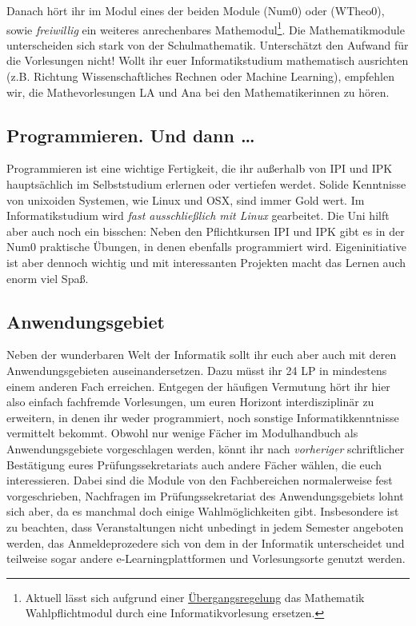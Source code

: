 Danach hört ihr im Modul  eines der beiden Module  (\gls{Num0}) oder  (\gls{WTheo0}), sowie \emph{freiwillig} ein weiteres anrechenbares Mathemodul\footnote{Aktuell lässt sich aufgrund einer \href{https://www.informatik.uni-heidelberg.de/?id=400}{Übergangsregelung} das Mathematik Wahlpflichtmodul durch eine Informatikvorlesung ersetzen.}. Die Mathematikmodule unterscheiden sich stark von der Schulmathematik. Unterschätzt den Aufwand für die Vorlesungen nicht! Wollt ihr euer Informatikstudium mathematisch ausrichten (z.B. Richtung Wissenschaftliches Rechnen oder Machine Learning), empfehlen wir, die Mathevorlesungen \gls{LA} und \gls{Ana} bei den Mathematikerinnen zu hören.

\subsection{Programmieren. Und dann \dots}

Programmieren ist eine wichtige Fertigkeit, die ihr außerhalb von \gls{IPI} und \gls{IPK} hauptsächlich im Selbststudium erlernen oder vertiefen werdet. Solide Kenntnisse von unixoiden Systemen, wie Linux und OSX, sind immer Gold wert. Im Informatikstudium wird \emph{fast ausschließlich mit Linux} gearbeitet. Die Uni hilft aber auch noch ein bisschen: Neben den Pflichtkursen \gls{IPI} und \gls{IPK} gibt es in der \gls{Num0} praktische Übungen, in denen ebenfalls programmiert wird. Eigeninitiative ist aber dennoch wichtig und mit interessanten Projekten macht das Lernen auch enorm viel Spaß.

\subsection{Anwendungsgebiet}

Neben der wunderbaren Welt der Informatik sollt ihr euch aber auch mit deren Anwendungsgebieten auseinandersetzen. Dazu müsst ihr 24 \gls{LP} in mindestens einem anderen Fach erreichen. Entgegen der häufigen Vermutung hört ihr hier also einfach fachfremde Vorlesungen, um euren Horizont interdisziplinär zu erweitern, in denen ihr weder programmiert, noch sonstige Informatikkenntnisse vermittelt bekommt. Obwohl nur wenige Fächer im Modulhandbuch als Anwendungsgebiete vorgeschlagen werden, könnt ihr nach \emph{vorheriger} schriftlicher Bestätigung eures Prüfungssekretariats auch andere Fächer wählen, die euch interessieren. Dabei sind die Module von den Fachbereichen normalerweise fest vorgeschrieben, Nachfragen im Prüfungssekretariat des Anwendungsgebiets lohnt sich aber, da es manchmal doch einige Wahlmöglichkeiten gibt. Insbesondere ist zu beachten, dass Veranstaltungen nicht unbedingt in jedem Semester angeboten werden, das Anmeldeprozedere sich von dem in der Informatik unterscheidet und teilweise sogar andere e-Learningplattformen und Vorlesungsorte genutzt werden.

